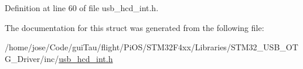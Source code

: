 Definition at line 60 of file usb\-\_\-hcd\-\_\-int.\-h.



The documentation for this struct was generated from the following file\-:\begin{DoxyCompactItemize}
\item 
/home/jose/\-Code/gui\-Tau/flight/\-Pi\-O\-S/\-S\-T\-M32\-F4xx/\-Libraries/\-S\-T\-M32\-\_\-\-U\-S\-B\-\_\-\-O\-T\-G\-\_\-\-Driver/inc/\hyperlink{usb__hcd__int_8h}{usb\-\_\-hcd\-\_\-int.\-h}\end{DoxyCompactItemize}
